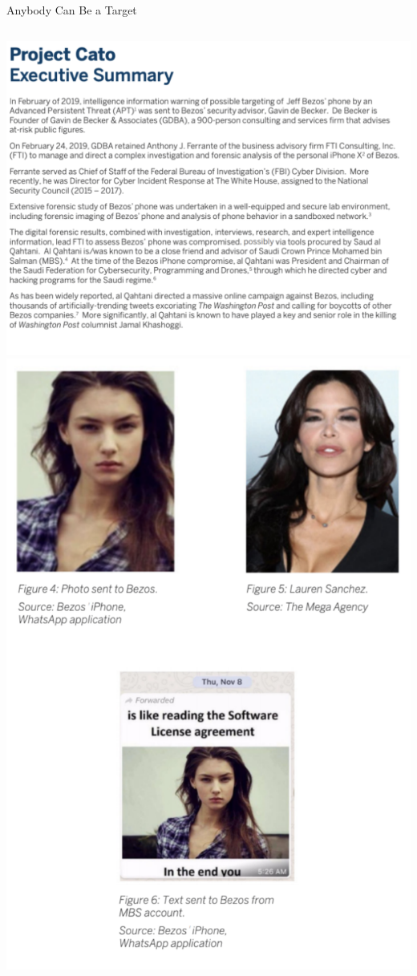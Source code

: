 \documentclass[nobackground,dvipsnames,table,aspectratio=169]{beamer}
\begin{document}
\begin{frame}{Anybody Can Be a Target}
    \begin{columns}
            \includegraphics[width=\textwidth]{project-cato-executive-summary}
            \includegraphics[width=\textwidth]{project-cato-photos}
    \end{columns}
\end{frame}
\end{document}
